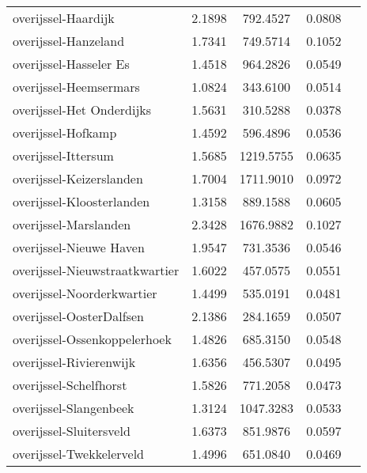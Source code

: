 \begin{longtable}{llccc}
	overijssel-Haardijk                       & 2.1898  & 792.4527  & 0.0808                 \\
	overijssel-Hanzeland                      & 1.7341  & 749.5714  & 0.1052                 \\
	overijssel-Hasseler Es                    & 1.4518  & 964.2826  & 0.0549                 \\
	overijssel-Heemsermars                    & 1.0824  & 343.6100  & 0.0514                 \\
	overijssel-Het Onderdijks                 & 1.5631  & 310.5288  & 0.0378                 \\
	overijssel-Hofkamp                        & 1.4592  & 596.4896  & 0.0536                 \\
	overijssel-Ittersum                       & 1.5685  & 1219.5755 & 0.0635                 \\
	overijssel-Keizerslanden                  & 1.7004  & 1711.9010 & 0.0972                 \\
	overijssel-Kloosterlanden                 & 1.3158  & 889.1588  & 0.0605                 \\
	overijssel-Marslanden                     & 2.3428  & 1676.9882 & 0.1027                 \\
	overijssel-Nieuwe Haven                   & 1.9547  & 731.3536  & 0.0546                 \\
	overijssel-Nieuwstraatkwartier            & 1.6022  & 457.0575  & 0.0551                 \\
	overijssel-Noorderkwartier                & 1.4499  & 535.0191  & 0.0481                 \\
	overijssel-OosterDalfsen                  & 2.1386  & 284.1659  & 0.0507                 \\
	overijssel-Ossenkoppelerhoek              & 1.4826  & 685.3150  & 0.0548                 \\
	overijssel-Rivierenwijk                   & 1.6356  & 456.5307  & 0.0495                 \\
	overijssel-Schelfhorst                    & 1.5826  & 771.2058  & 0.0473                 \\
	overijssel-Slangenbeek                    & 1.3124  & 1047.3283 & 0.0533                 \\
	overijssel-Sluitersveld                   & 1.6373  & 851.9876  & 0.0597                 \\
	overijssel-Twekkelerveld                  & 1.4996  & 651.0840  & 0.0469                 \\

\end{longtable}
